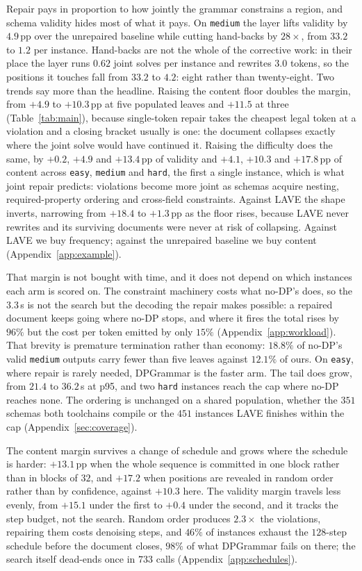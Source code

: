 \documentclass{article}
\begin{document}
Repair pays in proportion to how jointly the grammar constrains a region, and
schema validity hides most of what it pays. On \texttt{medium} the layer lifts
validity by $4.9$\,pp over the unrepaired baseline while cutting hand-backs by
$28\times$, from $33.2$ to $1.2$ per instance. Hand-backs are not the whole of
the corrective work: in their place the layer runs $0.62$ joint solves per
instance and rewrites $3.0$ tokens, so the positions it touches fall from $33.2$
to $4.2$: eight rather than twenty-eight. Two trends say more than the headline. Raising the content floor doubles the margin, from
$+4.9$ to $+10.3$\,pp at five populated leaves and $+11.5$ at three
(Table~\ref{tab:main}), because single-token repair takes the cheapest legal
token at a violation and a closing bracket usually is one: the document collapses
exactly where the joint solve would have continued it. Raising the difficulty
does the same, by $+0.2$, $+4.9$ and $+13.4$\,pp of validity and $+4.1$, $+10.3$
and $+17.8$\,pp of content across \texttt{easy}, \texttt{medium} and
\texttt{hard}, the first a single instance, which is what joint repair predicts: violations
become more joint as schemas acquire nesting, required-property ordering and
cross-field constraints. Against LAVE the shape inverts, narrowing from $+18.4$
to $+1.3$\,pp as the floor rises, because LAVE never rewrites and its surviving
documents were never at risk of collapsing. Against LAVE we buy frequency;
against the unrepaired baseline we buy content (Appendix~\ref{app:example}).

That margin is not bought with time, and it does not depend on which instances
each arm is scored on. The constraint machinery costs what no-DP's does, so the $3.3$\,s is not the
search but the decoding the repair makes possible: a repaired document keeps
going where no-DP stops, and where it fires the total rises by $96\%$ but the
cost per token emitted by only $15\%$ (Appendix~\ref{app:workload}). That brevity is premature termination rather than economy: $18.8\%$ of no-DP's valid \texttt{medium} outputs
carry fewer than five leaves against $12.1\%$ of ours. On \texttt{easy}, where repair is rarely needed, DPGrammar is the faster arm. The tail does grow,
from $21.4$ to $36.2$\,s at p95, and two \texttt{hard} instances reach the cap
where no-DP reaches none. The ordering is unchanged on a shared population, whether the $351$ schemas both
toolchains compile or the $451$ instances LAVE finishes within the cap (Appendix~\ref{sec:coverage}).

The content margin survives a change of schedule and grows where the schedule is
harder: $+13.1$\,pp when the whole sequence is committed in one block rather than
in blocks of $32$, and $+17.2$ when positions are revealed in random order rather
than by confidence, against $+10.3$ here. The validity margin travels less
evenly, from $+15.1$ under the first to $+0.4$ under the second, and it tracks the step budget, not the search. Random order produces
$2.3\times$ the violations, repairing them costs denoising steps, and $46\%$ of instances exhaust the $128$-step schedule before the document closes, $98\%$ of what DPGrammar fails on there; the search itself dead-ends once in
$733$ calls (Appendix~\ref{app:schedules}).
\end{document}
